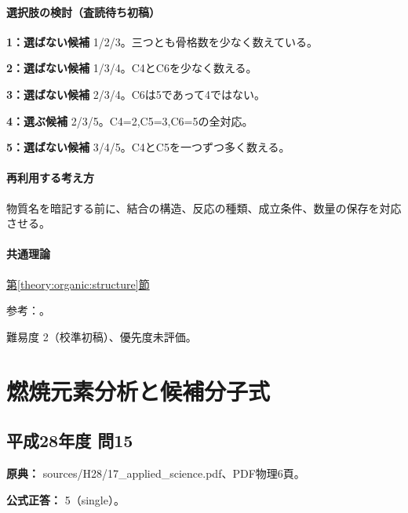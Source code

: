 \paragraph{選択肢の検討（査読待ち初稿）}\mbox{}\par

\noindent\textbf{1：選ばない候補} 1/2/3。三つとも骨格数を少なく数えている。\par

\noindent\textbf{2：選ばない候補} 1/3/4。C4とC6を少なく数える。\par

\noindent\textbf{3：選ばない候補} 2/3/4。C6は5であって4ではない。\par

\noindent\textbf{4：選ぶ候補} 2/3/5。C4=\allowbreak{}2,C5=\allowbreak{}3,C6=\allowbreak{}5の全対応。\par

\noindent\textbf{5：選ばない候補} 3/4/5。C4とC5を一つずつ多く数える。\par

\paragraph{再利用する考え方} 物質名を暗記する前に、結合の構造、反応の種類、成立条件、数量の保存を対応させる。

\paragraph{共通理論} \hyperref[theory:organic:structure]{第\ref*{theory:organic:structure}節}

\par 参考：\cite{organic_isomers}。

\par 難易度 2（校準初稿）、優先度未評価。

\section{燃焼元素分析と候補分子式}

\subsection{平成28年度 問15}
\label{q:h28-reg-applied-15}

\noindent\textbf{原典：} sources/H28/17\_applied\_science.pdf、PDF物理6頁。

\textbf{公式正答：} 5（single）。

